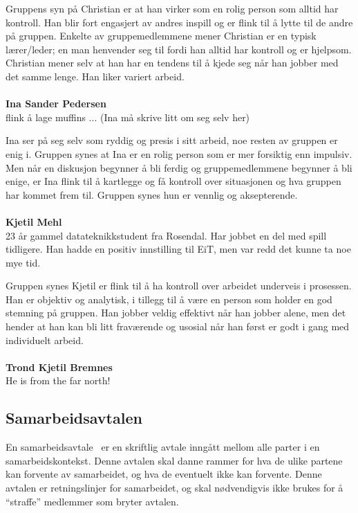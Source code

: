 Gruppens syn på Christian er at han virker som en rolig person som
alltid har kontroll. Han blir fort engasjert av andres inspill og er
flink til å lytte til de andre på gruppen. Enkelte av gruppemedlemmene
mener Christian er en typisk lærer/leder; en man henvender seg til fordi
han alltid har kontroll og er hjelpsom. Christian mener selv at han har
en tendens til å kjede seg når han jobber med det samme lenge. Han liker
variert arbeid. \\\\
\textbf{Ina Sander Pedersen}\\
flink å lage muffins ... (Ina må skrive litt om seg selv her)

Ina ser på seg selv som ryddig og presis i sitt arbeid, noe resten av
gruppen er enig i. Gruppen synes at Ina er en rolig person som er mer
forsiktig enn impulsiv. Men når en diskusjon begynner å bli ferdig og
gruppemedlemmene begynner å bli enige, er Ina flink til å kartlegge og
få kontroll over situasjonen og hva gruppen har kommet frem til. Gruppen
synes hun er vennlig og aksepterende.\\\\
\textbf{Kjetil Mehl}\\
23 år gammel datateknikkstudent fra Rosendal. Har jobbet en del med
spill tidligere. Han hadde en positiv innstilling til EiT, men var
redd det kunne ta noe mye tid.

Gruppen synes Kjetil er flink til å ha kontroll over arbeidet underveis
i prosessen. Han er objektiv og analytisk, i tillegg til å være en
person som holder en god stemning på gruppen. Han jobber veldig
effektivt når han jobber alene, men det hender at han kan bli litt
fraværende og usosial når han først er godt i gang med individuelt
arbeid. \\\\
\textbf{Trond Kjetil Bremnes}\\
He is from the far north! \\

\subsection{Samarbeidsavtalen}
En samarbeidsavtale~\cite{samarbeidsavtale} er en skriftlig avtale
inngått mellom alle parter i en samarbeidskontekst. Denne avtalen skal
danne rammer for hva de ulike partene kan forvente av samarbeidet, og
hva de eventuelt ikke kan forvente. Denne avtalen er retningslinjer for
samarbeidet, og skal nødvendigvis ikke brukes for å ``straffe''
medlemmer som bryter avtalen.

